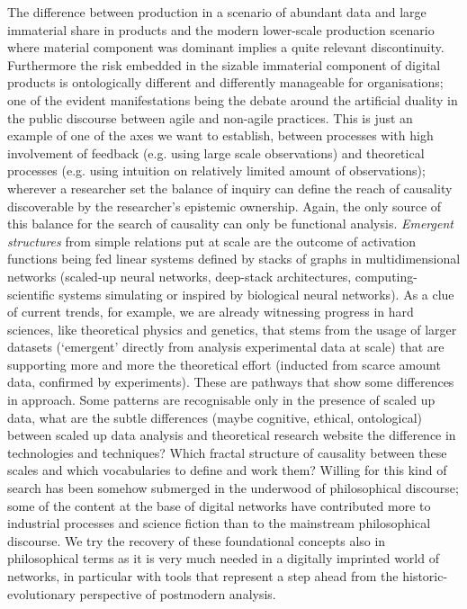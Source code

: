 \documentclass[14pt]{extarticle}
\begin{document}
The difference between production in a scenario of abundant data and large immaterial share in products and the modern lower-scale production scenario where material component was dominant implies a quite relevant discontinuity.
\newline
Furthermore the risk embedded in the sizable immaterial component of digital products is ontologically different and differently manageable for organisations; one of the evident manifestations being the debate around the artificial duality in the public discourse between agile and non-agile practices. This is just an example of one of the axes we want to establish, between processes with high involvement of feedback (e.g. using large scale observations) and theoretical processes (e.g. using intuition on relatively limited amount of observations); wherever a researcher set the balance of inquiry can define the reach of causality discoverable by the researcher’s epistemic ownership. Again, the only source of this balance for the search of causality can only be functional analysis.
\newline
\hspace*{15mm}\textit{Emergent structures} from simple relations put at scale are the outcome of activation functions being fed linear systems defined by stacks of graphs in multidimensional networks (scaled-up neural networks, deep-stack architectures, computing-scientific systems simulating or inspired by biological neural networks). As a clue of current trends, for example, we are already witnessing progress in hard sciences, like theoretical physics and genetics, that stems from the usage of larger datasets (‘emergent’ directly from analysis experimental data at scale) that are supporting more and more the theoretical effort (inducted from scarce amount data, confirmed by experiments). These are pathways that show some differences in approach. Some patterns are recognisable only in the presence of scaled up data, what are the subtle differences (maybe cognitive, ethical, ontological) between scaled up data analysis and theoretical research website the difference in technologies and techniques? Which fractal structure of causality between these scales and which vocabularies to define and work them?
\newline
Willing for this kind of search has been somehow submerged in the underwood of philosophical discourse; some of the content at the base of digital networks have contributed more to industrial processes and science fiction than to the mainstream philosophical discourse. We try the recovery of these foundational concepts also in philosophical terms as it is very much needed in a digitally imprinted world of networks, in particular with tools that represent a step ahead from the historic-evolutionary perspective of postmodern analysis.
\end{document}
